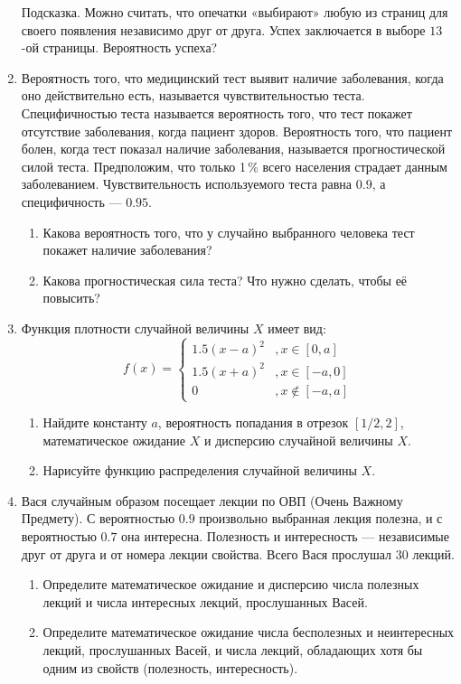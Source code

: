 \documentclass[12pt, a4paper]{article}\usepackage[]{graphicx}\usepackage[]{color}
\begin{document}
\begin{enumerate}
Подсказка.  Можно считать, что опечатки «выбирают» любую из страниц для своего появления независимо друг от друга. Успех заключается в выборе $13$-ой страницы. Вероятность успеха?

\item Вероятность того, что медицинский тест выявит наличие заболевания, когда оно действительно есть, называется чувствительностью теста. Специфичностью теста называется вероятность того, что тест покажет отсутствие заболевания, когда пациент здоров. Вероятность того, что пациент болен, когда тест показал наличие заболевания, называется прогностической силой теста. Предположим, что только 1\,\%  всего населения страдает данным заболеванием.  Чувствительность используемого теста равна $0.9$, а специфичность — $0.95$.
\begin{enumerate}
\item Какова вероятность того, что у случайно выбранного человека тест покажет наличие заболевания?
\item Какова прогностическая сила теста? Что нужно сделать, чтобы её повысить?
\end{enumerate}

\item Функция плотности случайной величины $X$ имеет вид:
\begin{equation*}
f(x) =
 \begin{cases}
   1.5 (x-a)^2 &, x \in [0,a]\\
   1.5 (x+a)^2 &, x \in [-a,0]\\
   0 &, x \not\in [-a,a]
 \end{cases}
\end{equation*}

\begin{enumerate}
\item Найдите константу $a$, вероятность попадания в отрезок $\left[1/2, 2 \right]$, математическое ожидание $X$ и дисперсию случайной величины $X$.
\item Нарисуйте функцию распределения случайной величины $X$.
\end{enumerate}

\item Вася случайным образом посещает лекции по ОВП (Очень Важному Предмету). С вероятностью $0.9$ произвольно выбранная лекция полезна, и с вероятностью $0.7$ она интересна. Полезность и интересность –-- независимые друг от друга и от номера лекции свойства. Всего Вася прослушал 30 лекций.
\begin{enumerate}
\item Определите математическое ожидание и дисперсию числа полезных лекций и числа интересных лекций, прослушанных Васей.
\item Определите математическое ожидание числа бесполезных и неинтересных лекций, прослушанных Васей, и числа лекций, обладающих хотя бы одним из свойств (полезность,  интересность).
\end{enumerate}


\end{enumerate}
\end{document}
